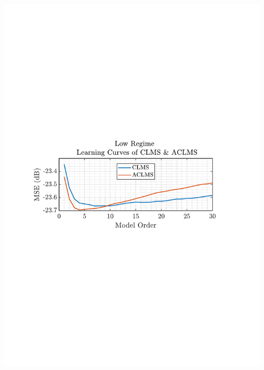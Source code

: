 \documentclass[12pt]{article}
\begin{document}
\begin{minipage}{0.49\textwidth}
				\includegraphics[trim={2.2cm 11.2cm 3.15cm  11.2cm}, clip, width=\textwidth]{../MATLAB/figures/q3_1b_fig05.pdf} 
				

\end{minipage}
\end{document}
